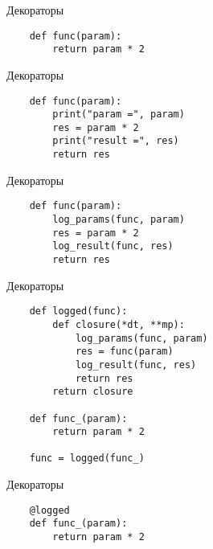 \documentclass{article}
\begin{document}
\begin{center} Декораторы \end{center}
\begin{lstlisting}
    def func(param):
        return param * 2

\end{lstlisting}
\newpage

\begin{center} Декораторы \end{center}
\begin{lstlisting}
    def func(param):
        print("param =", param)
        res = param * 2
        print("result =", res)
        return res
\end{lstlisting}
\newpage

\begin{center} Декораторы \end{center}
\begin{lstlisting}
    def func(param):
        log_params(func, param)
        res = param * 2
        log_result(func, res)
        return res
\end{lstlisting}
\newpage

\begin{center} Декораторы \end{center}
\begin{lstlisting}
    def logged(func):
        def closure(*dt, **mp):
            log_params(func, param)
            res = func(param)
            log_result(func, res)
            return res
        return closure

    def func_(param):
        return param * 2

    func = logged(func_)
\end{lstlisting}
\newpage

\begin{center} Декораторы \end{center}
\begin{lstlisting}
    @logged
    def func_(param):
        return param * 2
\end{lstlisting}
\newpage
\end{document}
